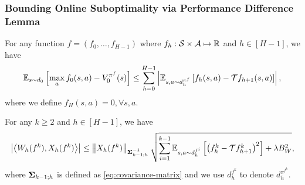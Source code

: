 \subsubsection{Bounding Online Suboptimality via Performance Difference Lemma}
\begin{lemma}
    \label{lemma:perf-diff-online}
    For any function $f=(f_0,\dots,f_{H-1})$ where $f_h:\mathcal S\times \mathcal A\mapsto \mathbb R$ and $h\in[H-1]$, we have
    \begin{equation}
        \mathbb E_{s\sim d_0}\left[ \max_a f_0(s,a)-V_0^{\pi^f}(s) \right]\leq \sum_{h=0}^{H-1}\left| \mathbb E_{s,a\sim d_h^{\pi^f}}\left[ f_h(s,a)-\mathcal Tf_{h+1}(s,a) \right] \right|,
    \end{equation}
    where we define $f_H(s,a)=0,\forall s,a$.
\end{lemma}
\begin{lemma}
    \label{lemma:bilinear-upper-bound}
    For any $k\geq2$ and $h\in [H-1]$, we have
    \begin{equation}
        \left| \left\langle W_h(f^k), X_h(f^k) \right\rangle \right|\leq \left\| X_h(f^k) \right\|_{\boldsymbol \Sigma^{-1}_{k-1;h}}\sqrt{\sum_{i=1}^{k-1}\mathbb E_{s,a\sim d_h^{f^i}}\left[ \left( f_h^k-\mathcal T f_{h+1}^k \right)^2 \right]+\lambda B_W^2},
    \end{equation}
    where $\boldsymbol \Sigma_{k-1;h}$ is defined as \eqref{eq:covariance-matrix} and we use $d_h^{f^k}$ to denote $d_h^{\pi^{f^k}}$.
\end{lemma}
